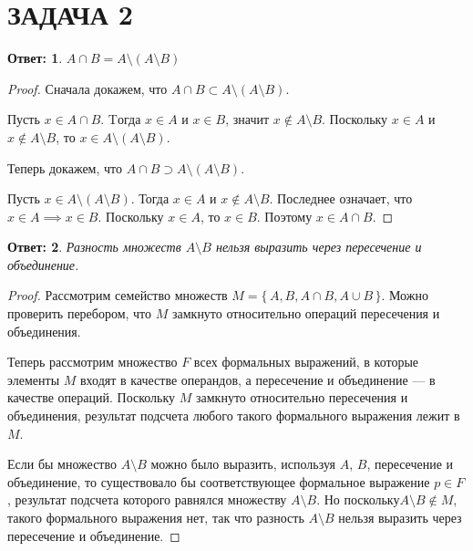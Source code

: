 \documentclass[a4paper]{article}
\theoremstyle{dotless}
\newtheorem*{answer}{Ответ:}
\begin{document}
\section*{ЗАДАЧА 2}

\begin{answer}
$A\cap B = A \setminus (A \setminus B)$
\end{answer}

\begin{proof}
Сначала докажем, что $A\cap B \subset A \setminus (A \setminus B)$. 

Пусть $x\in A\cap B$. Tогда $x \in A$ и $x\in B$, значит $x\not\in A \setminus B$. Поскольку $x \in A$ и $x\not\in A \setminus B$, то $x\in A \setminus (A \setminus B)$.

Теперь докажем, что $A\cap B \supset A \setminus (A \setminus B)$.

Пусть $x\in A \setminus (A \setminus B)$. Тогда $x\in A$ и $x\not\in A \setminus B$. Последнее означает, что $x\in A \implies x\in B$. Поскольку $x\in A$, то $x\in B$. Поэтому $x \in A\cap B$.
\end{proof}

\begin{answer}
Разность множеств $A\setminus B$ нельзя выразить через пересечение и объединение.
\end{answer}

\begin{proof}
Рассмотрим семейство множеств $M=\{\,A, B, A\cap B, A\cup B\,\}$. Можно проверить перебором, что $M$ замкнуто относительно операций пересечения и объединения.

Теперь рассмотрим множество $F$ всех формальных выражений, в которые элементы $M$ входят в качестве операндов, а пересечение и объединение --- в качестве операций. Поскольку $M$ замкнуто относительно пересечения и объединения, результат подсчета любого такого формального выражения лежит в $M$.

Если бы множество $A\setminus B$ можно было выразить, используя $A$, $B$, пересечение и объединение, то существовало бы соответствующее формальное выражение $p\in F$, результат подсчета которого равнялся множеству $A\setminus B$. Но поскольку$A\setminus B \not\in M$, такого формального выражения нет, так что разность $A\setminus B$ нельзя выразить через пересечение и объединение.
\end{proof}
\end{document}
